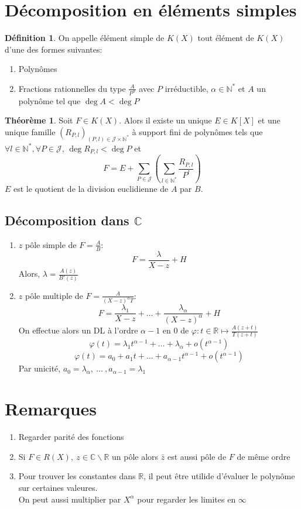 \documentclass[fleqn]{article}
\theoremstyle{definition} \newtheorem*{defi}{D\'efinition}
\theoremstyle{definition} \newtheorem*{theo}{Th\'eor\`eme}
\theoremstyle{definition} \newtheorem*{coro}{Corollaire}
\theoremstyle{definition} \newtheorem*{nota}{Notation}
\theoremstyle{remark} \newtheorem*{rqs}{Remarques}
\theoremstyle{definition} \newtheorem*{prop}{Propri\'et\'e}
\begin{document}
\section{D\'ecomposition en \'el\'ements simples}
\begin{defi}
	On appelle \'el\'ement simple de $K(X)$ tout \'el\'ement de $K(X)$ d'une des formes suivantes:
	\begin{enumerate}
		\item Polyn\^omes
		\item Fractions rationnelles du type $\frac{A}{P^\alpha}$ avec $P$ irr\'eductible, $\alpha \in \mathbb{N}^*$ et $A$ un polyn\^ome tel que
			$\deg A < \deg P$
	\end{enumerate}
\end{defi}

\begin{theo}
	Soit $F \in K(X)$. Alors il existe un unique $E \in K[X]$ et une unique famille $(R_{P,l})_{(P,l) \in \mathcal{J} \times \mathbb{N}^*}$
	\`a support fini de polyn\^omes tels que \mbox{$\forall l \in \mathbb{N}^*, \forall P \in \mathcal{J}$}, $\deg R_{P,l} < \deg P$ et
	\[F = E + \sum_{P \in \mathcal{J}} \left(\sum_{l \in \mathbb{N}^*} \frac{R_{P,l}}{P^l}\right)\]
	$E$ est le quotient de la division euclidienne de $A$ par $B$.
\end{theo}

\subsection{D\'ecomposition dans $\mathbb{C}$}
\begin{enumerate}
	\item $z$ p\^ole simple de $F=\frac{A}{B}$:
		\[F = \frac{\lambda}{X -z} + H\]
		Alors, $\lambda = \frac{A(z)}{B'(z)}$
	\item $z$ p\^ole multiple de $F= \frac{A}{(X-z)^\alpha T}$:
		\[F = \frac{\lambda_1}{X-z} + \hdots + \frac{\lambda_\alpha}{(X-z)^\alpha} + H\]
		On effectue alors un DL \`a l'ordre $\alpha -1$ en $0$ de $\varphi: t\in \mathbb{R} \mapsto \frac{A(z+t)}{T(z+t)}$
		\[\varphi(t) = \lambda_1 t^{\alpha -1} + \hdots + \lambda_\alpha + o(t^{\alpha -1})\]
		\[\varphi(t) = a_0 + a_1 t + \hdots + a_{\alpha -1} t^{\alpha -1} + o(t^{\alpha -1})\]
		Par unicit\'e, $a_0 = \lambda_\alpha,\ \hdots\ , a_{\alpha-1} = \lambda_1$
\end{enumerate}

\section{Remarques}
\begin{enumerate}
	\item Regarder parit\'e des fonctions
	\item Si $F \in R(X),\ z \in \mathbb{C} \backslash \mathbb{R}$ un p\^ole alors $\bar{z}$ est aussi p\^ole de $F$ de m\^eme ordre
	\item Pour trouver les constantes dans $\mathbb{R}$, il peut \^etre utilide d'\'evaluer le polyn\^ome sur certaines valeures.\\ On peut aussi
		multiplier par $X^\alpha$ pour regarder les limites en $\infty$
\end{enumerate}
\end{document}
